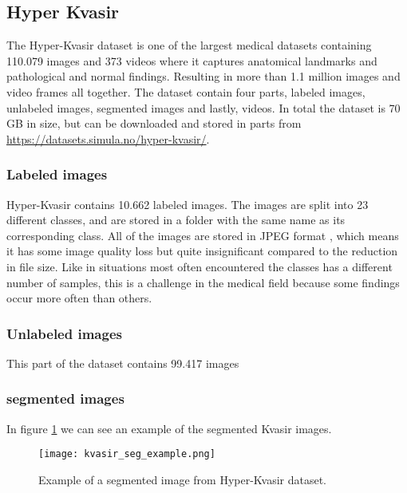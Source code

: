 \documentclass[thesis.tex]{subfiles}
\begin{document}
\subsection{Hyper Kvasir} \label{hyper_kvasir}
The Hyper-Kvasir dataset \cite{HyperKvasirComprehensive19} is one of the largest medical datasets containing 110.079 images and 373 videos where it captures anatomical landmarks and pathological and normal findings. Resulting in more than 1.1 million images and video frames all together. The dataset contain four parts, labeled images, unlabeled images, segmented images and lastly, videos. In total the dataset is 70 GB in size, but can be downloaded and stored in parts from \url{https://datasets.simula.no/hyper-kvasir/}.


\subsubsection{Labeled images}
Hyper-Kvasir contains 10.662 labeled images. The images are split into 23 different classes, and are stored in a folder with the same name as its corresponding class. All of the images are stored in JPEG format \cite{JPEGStill92}, which means it has some image quality loss but quite insignificant compared to the reduction in file size. Like in situations most often encountered the classes has a different number of samples, this is a challenge in the medical field because some findings occur more often than others.


\subsubsection{Unlabeled images}
This part of the dataset contains 99.417 images

\subsubsection{segmented images}
In figure \ref{fig:kvasir_seg_example} we can see an example of the segmented Kvasir images.

\begin{figure}[H] %
  \begin{center}
    \texttt{[image: kvasir\_seg\_example.png]}
    \caption{Example of a segmented image from Hyper-Kvasir dataset.}
    \label{fig:kvasir_seg_example}
  \end{center}
\end{figure}
\end{document}
